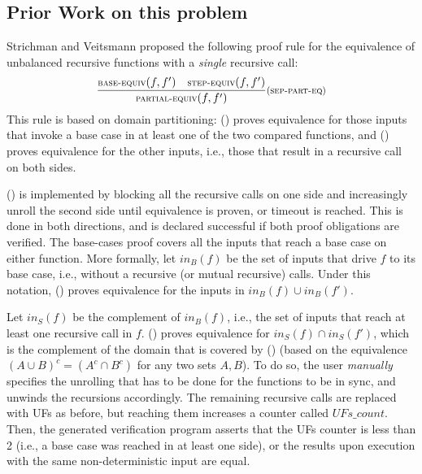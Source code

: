 \subsection{Prior Work on this problem}
\label{sec:prev}
Strichman and Veitsmann \cite{DBLP:conf/fm/StrichmanV16} proposed the following  proof rule for the equivalence of unbalanced recursive functions with a \emph{single} recursive call:
\begin{equation}\label{eq:SEP-PART-EQ}
 {\frac {\text{\premise{BASE-EQUIV}}(f,f') \quad\text{\premise{STEP-EQUIV}}(f,f')}{\text{\premise{PARTIAL-EQUIV}}(f,f')}} 
  \text{\rule{SEP-PART-EQ}}
\end{equation}
This rule is based on domain partitioning: () proves equivalence for those inputs that invoke a base case in at least one of the two compared functions, and () proves equivalence for the other inputs, i.e., those that result in a recursive call on both sides.

() is implemented by blocking all the recursive calls on one side and increasingly unroll the second side until equivalence is proven, or timeout is reached. This is done in both directions, and is declared successful if both proof obligations are verified. The base-cases proof covers all the inputs that reach a base case on either function. More formally, let $in_B(f)$ be the set of inputs that drive $f$ to its base case, i.e., without a recursive (or mutual recursive) calls. Under this notation, () proves equivalence for the  inputs in $in_B(f) \cup in_B(f')$.

Let $in_S(f)$ be the complement of $in_B(f)$, i.e., the set of inputs that reach at least one recursive call in $f$.  () proves equivalence for $in_S(f) \cap in_S(f')$, which is the complement of the domain that is covered by () (based on the equivalence $(A \cup B)^c = (A^c \cap B^c)$ for any two sets $A,B$). To do so, the user \emph{manually} specifies the unrolling that has to be done for the functions to be in sync, and  unwinds the recursions accordingly. The remaining recursive calls are replaced with UFs as before, but reaching them increases a counter called $UFs\_count$. Then, the generated verification program asserts that the UFs counter is less than 2  (i.e., a base case was reached in at least one side), or the results upon execution with the same non-deterministic input are equal. 

